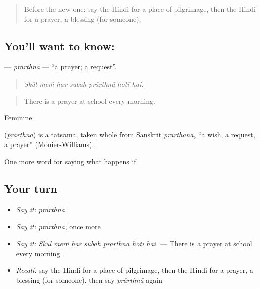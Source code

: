 \label{lesson:HI-C539-prarthna}



\begin{quote}
Before the new one: say the Hindi for a place of pilgrimage, then the Hindi for a prayer, a blessing (for someone).
\end{quote}

\subsection*{You'll want to know: }
\textbf{} — \emph{prārthnā} — \textquotedblleft{}a prayer; a request\textquotedblright{}.

\begin{quote}
      
\end{quote}

\begin{quote}
\emph{Skūl meṁ har subah prārthnā hotī hai.}
\end{quote}

\begin{quote}
There is a prayer at school every morning.
\end{quote}

Feminine.

\begin{cousinweb}
\textbf{} (\emph{prārthnā}) is a tatsama, taken whole from Sanskrit \emph{prārthanā}, \textquotedblleft{}a wish, a request, a prayer\textquotedblright{} (Monier-Williams).
\end{cousinweb}

\begin{grammarlens}[title={What you've built}]
One more word for saying what happens if.
\end{grammarlens}

\subsection*{Your turn}
\begin{itemize}
\raggedright
  \item \emph{Say it:} \emph{prārthnā}
  \item \emph{Say it:} \emph{prārthnā}, once more
  \item \emph{Say it:} \emph{Skūl meṁ har subah prārthnā hotī hai.} — There is a prayer at school every morning.
  \item \emph{Recall:} say the Hindi for a place of pilgrimage, then the Hindi for a prayer, a blessing (for someone), then say \emph{prārthnā} again
\end{itemize}

